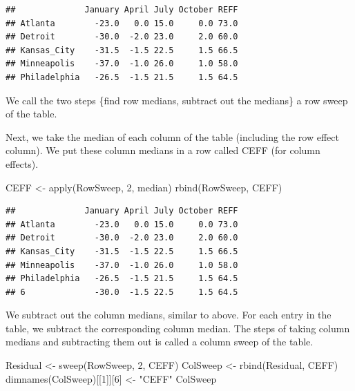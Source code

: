 \documentclass[
]{book}
\newenvironment{Shaded}{\begin{snugshade}}{\end{snugshade}}
\newcommand{\DecValTok}[1]{\textcolor[rgb]{0.00,0.00,0.81}{#1}}
\newcommand{\FunctionTok}[1]{\textcolor[rgb]{0.00,0.00,0.00}{#1}}
\newcommand{\NormalTok}[1]{#1}
\newcommand{\OtherTok}[1]{\textcolor[rgb]{0.56,0.35,0.01}{#1}}
\newcommand{\StringTok}[1]{\textcolor[rgb]{0.31,0.60,0.02}{#1}}
\begin{document}
\begin{verbatim}
##              January April July October REFF
## Atlanta        -23.0   0.0 15.0     0.0 73.0
## Detroit        -30.0  -2.0 23.0     2.0 60.0
## Kansas_City    -31.5  -1.5 22.5     1.5 66.5
## Minneapolis    -37.0  -1.0 26.0     1.0 58.0
## Philadelphia   -26.5  -1.5 21.5     1.5 64.5
\end{verbatim}

We call the two steps \{find row medians, subtract out the medians\} a row sweep of the table.

Next, we take the median of each column of the table (including the row effect column). We put these column medians in a row called CEFF (for column effects).

\begin{Shaded}
\begin{Highlighting}[]
\NormalTok{CEFF }\OtherTok{\textless{}{-}} \FunctionTok{apply}\NormalTok{(RowSweep, }\DecValTok{2}\NormalTok{, median)}
\FunctionTok{rbind}\NormalTok{(RowSweep, CEFF)}
\end{Highlighting}
\end{Shaded}

\begin{verbatim}
##              January April July October REFF
## Atlanta        -23.0   0.0 15.0     0.0 73.0
## Detroit        -30.0  -2.0 23.0     2.0 60.0
## Kansas_City    -31.5  -1.5 22.5     1.5 66.5
## Minneapolis    -37.0  -1.0 26.0     1.0 58.0
## Philadelphia   -26.5  -1.5 21.5     1.5 64.5
## 6              -30.0  -1.5 22.5     1.5 64.5
\end{verbatim}

We subtract out the column medians, similar to above. For each entry in the table, we subtract the corresponding column median. The steps of taking column medians and subtracting them out is called a column sweep of the table.

\begin{Shaded}
\begin{Highlighting}[]
\NormalTok{Residual }\OtherTok{\textless{}{-}} \FunctionTok{sweep}\NormalTok{(RowSweep, }\DecValTok{2}\NormalTok{, CEFF)}
\NormalTok{ColSweep }\OtherTok{\textless{}{-}} \FunctionTok{rbind}\NormalTok{(Residual, CEFF)}
\FunctionTok{dimnames}\NormalTok{(ColSweep)[[}\DecValTok{1}\NormalTok{]][}\DecValTok{6}\NormalTok{] }\OtherTok{\textless{}{-}} \StringTok{"CEFF"}
\NormalTok{ColSweep}
\end{Highlighting}
\end{Shaded}
\end{document}
